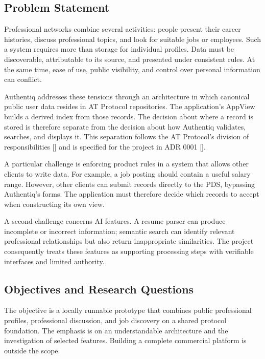 \documentclass[11pt,a4paper]{article}
\newcommand{\reflink}[1]{\hyperlink{ref:#1}{#1}}
\newcommand{\refsep}{}
\newcommand{\refs}[1]{\begingroup
  \gdef\refsep{}%
  \renewcommand*{\do}[1]{\refsep\reflink{##1}\gdef\refsep{, }}%
  [\docsvlist{#1}]\endgroup}
\begin{document}
\subsection{Problem Statement}

Professional networks combine several activities: people present their career histories, discuss professional topics, and look for suitable jobs or employees. Such a system requires more than storage for individual profiles. Data must be discoverable, attributable to its source, and presented under consistent rules. At the same time, ease of use, public visibility, and control over personal information can conflict.

Authentiq addresses these tensions through an architecture in which canonical public user data resides in AT Protocol repositories. The application's AppView builds a derived index from those records. The decision about where a record is stored is therefore separate from the decision about how Authentiq validates, searches, and displays it. This separation follows the AT Protocol's division of responsibilities \refs{L1} and is specified for the project in ADR 0001 \refs{P2}.

A particular challenge is enforcing product rules in a system that allows other clients to write data. For example, a job posting should contain a useful salary range. However, other clients can submit records directly to the PDS, bypassing Authentiq's forms. The application must therefore decide which records to accept when constructing its own view.

A second challenge concerns AI features. A resume parser can produce incomplete or incorrect information; semantic search can identify relevant professional relationships but also return inappropriate similarities. The project consequently treats these features as supporting processing steps with verifiable interfaces and limited authority.

\subsection{Objectives and Research Questions}

The objective is a locally runnable prototype that combines public professional profiles, professional discussion, and job discovery on a shared protocol foundation. The emphasis is on an understandable architecture and the investigation of selected features. Building a complete commercial platform is outside the scope.
\end{document}
